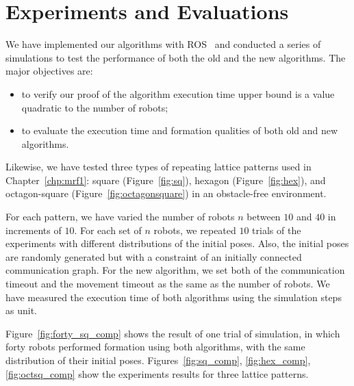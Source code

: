 \section{Experiments and Evaluations}
\label{sec:exp}
We have implemented our algorithms with ROS~\cite{QuiConGerFauFooLeiWheNg09} and conducted a series of simulations to test the performance of both the old and the new algorithms. 
%
The major objectives are:
\begin{itemize}
\item to verify our proof of the algorithm execution time upper bound is a value quadratic to the number of robots;
\item to evaluate the execution time and formation qualities of both old and new algorithms.
\end{itemize} 
 
 
Likewise, we have tested three types of repeating lattice patterns used in Chapter~\ref{chp:mrf1}:
square (Figure~\ref{fig:sq}), hexagon (Figure~\ref{fig:hex}), and octagon-square (Figure~\ref{fig:octagonsquare}) in an obstacle-free environment.
  
  
For each pattern, we have varied the number of robots $n$ between $10$ and $40$ in increments of $10$. 
%
For each set of $n$ robots, we repeated $10$ trials of the experiments with different distributions
of the initial poses. 
%
Also, the initial poses are randomly generated but with a constraint of an initially connected communication graph. 
%
For the new algorithm, we set both of the communication timeout and the movement timeout as the same as the number of robots. 
%
We have measured the execution time of both algorithms using the simulation steps as unit. 

Figure~\ref{fig:forty_sq_comp} shows the result of one trial of simulation, in which forty robots performed formation using both algorithms, with the same distribution of their initial poses.
%
Figures~\ref{fig:sq_comp}, \ref{fig:hex_comp}, \ref{fig:octsq_comp} show the experiments results for three lattice patterns.


